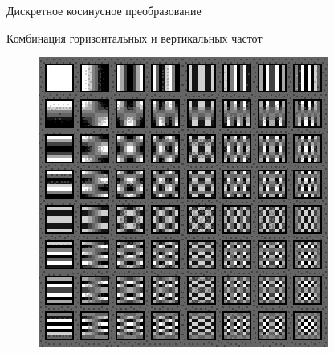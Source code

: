 \documentclass[11pt]{beamer}
\begin{document}
\begin{frame}{Дискретное косинусное преобразование}
\begin{block}{Комбинация горизонтальных и вертикальных частот}
\begin{figure}[H]
	\begin{center}
		\includegraphics[scale=0.35]{../pics/cosine_transform/matrix.png}
	\end{center}
\end{figure}	
\end{block}				
\end{frame} 
\end{document}
